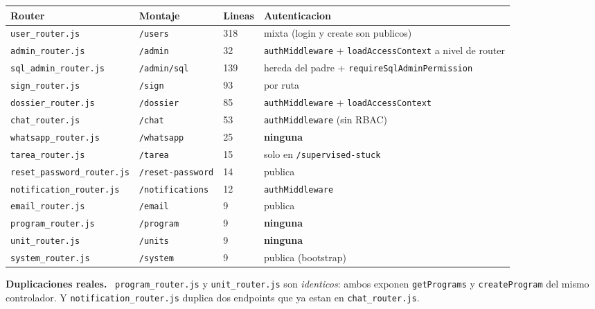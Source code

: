 \documentclass[11pt,a4paper,oneside]{report}
\newenvironment{nota}[1][Nota]{%
  \par\medskip
  \colorlet{shadecolor}{black!6}%
  \begin{shaded}\noindent\textbf{#1.}\ \ignorespaces}%
  {\end{shaded}\par\medskip}
\newcommand{\rt}[1]{\texttt{#1}}
\begin{document}
\begin{center}
\footnotesize
\begin{tabularx}{\textwidth}{@{}P{4.2cm}P{3.1cm}P{1.3cm}L@{}}
\toprule
\textbf{Router} & \textbf{Montaje} & \textbf{Lineas} & \textbf{Autenticacion} \\
\midrule
\rt{user\_router.js}           & \rt{/users}         & 318 & mixta (login y create son publicos) \\
\rt{admin\_router.js}          & \rt{/admin}         & 32  & \rt{authMiddleware} + \rt{loadAccessContext} a nivel de router \\
\rt{sql\_admin\_router.js}     & \rt{/admin/sql}     & 139 & hereda del padre + \rt{requireSqlAdminPermission} \\
\rt{sign\_router.js}           & \rt{/sign}          & 93  & por ruta \\
\rt{dossier\_router.js}        & \rt{/dossier}       & 85  & \rt{authMiddleware} + \rt{loadAccessContext} \\
\rt{chat\_router.js}           & \rt{/chat}          & 53  & \rt{authMiddleware} (sin RBAC) \\
\rt{whatsapp\_router.js}       & \rt{/whatsapp}      & 25  & \textbf{ninguna} \\
\rt{tarea\_router.js}          & \rt{/tarea}         & 15  & solo en \rt{/supervised-stuck} \\
\rt{reset\_password\_router.js}& \rt{/reset-password}& 14  & publica \\
\rt{notification\_router.js}   & \rt{/notifications} & 12  & \rt{authMiddleware} \\
\rt{email\_router.js}          & \rt{/email}         & 9   & publica \\
\rt{program\_router.js}        & \rt{/program}       & 9   & \textbf{ninguna} \\
\rt{unit\_router.js}           & \rt{/units}         & 9   & \textbf{ninguna} \\
\rt{system\_router.js}         & \rt{/system}        & 9   & publica (bootstrap) \\
\bottomrule
\end{tabularx}
\end{center}

\begin{nota}[Duplicaciones reales]
\rt{program\_router.js} y \rt{unit\_router.js} son \emph{identicos}: ambos exponen
\rt{getPrograms} y \rt{createProgram} del mismo controlador. Y \rt{notification\_router.js}
duplica dos endpoints que ya estan en \rt{chat\_router.js}.
\end{nota}
\end{document}
